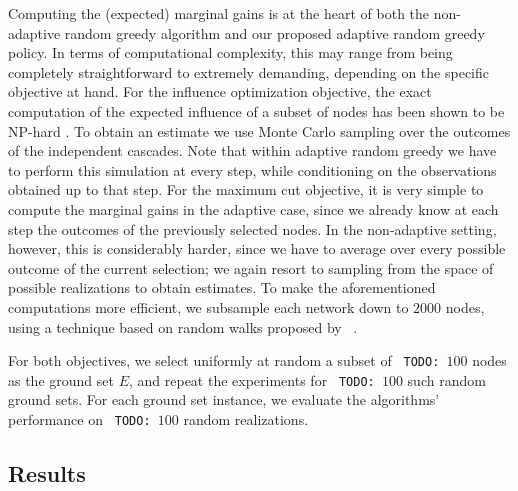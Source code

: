 \documentclass{article}
\newcommand{\todo}[1]{\noindent\texttt{\small\color[rgb]{0.5,0.1,0.1} TODO: #1}}
\newcommand{\citet}[1]{\citeauthor{#1}~\shortcite{#1}}
\begin{document}
Computing the (expected) marginal gains is at the heart of both the non-adaptive random greedy algorithm and our proposed adaptive random greedy policy.
In terms of computational complexity, this may range from being completely straightforward to extremely demanding, depending on the specific objective at hand.
For the influence optimization objective, the exact computation of the expected influence of a subset of nodes has been shown to be NP-hard \cite{kempe03}.
To obtain an estimate we use Monte Carlo sampling over the outcomes of the independent cascades.
Note that within adaptive random greedy we have to perform this simulation at every step, while conditioning on the observations obtained up to that step.
For the maximum cut objective, it is very simple to compute the marginal gains in the adaptive case, since we already know at each step the outcomes of the previously selected nodes.
In the non-adaptive setting, however, this is considerably harder, since we have to average over every possible outcome of the current selection; we again resort to sampling from the space of possible realizations to obtain estimates.
To make the aforementioned computations more efficient, we subsample each network down to $2000$ nodes, using a technique based on random walks proposed by \citet{leskovec06}.

For both objectives, we select uniformly at random a subset of \todo{$100$} nodes as the ground set $E$, and repeat the experiments for \todo{$100$} such random ground sets.
For each ground set instance, we evaluate the algorithms' performance on \todo{$100$} random realizations.

\subsection{Results}
\end{document}
